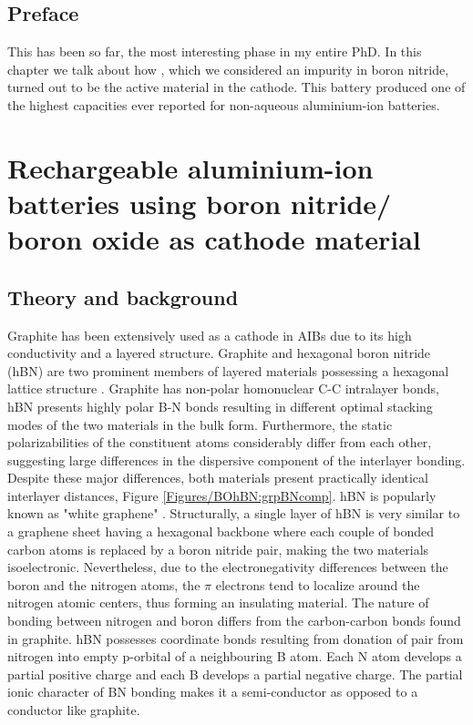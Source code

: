\section*{Preface}
This has been so far, the most interesting phase in my entire PhD. In this chapter we talk about how , which we considered an impurity in boron nitride, turned out to be the active material in the cathode. This battery produced one of the highest capacities ever reported for non-aqueous aluminium-ion batteries.   
\pagebreak
\chapter{Rechargeable aluminium-ion batteries using boron nitride/ boron oxide as cathode material} %
\label{BOhBN} %
\newcommand{\keyword}[1]{\textbf{#1}}
\newcommand{\tabhead}[1]{\textbf{#1}}
\newcommand{\code}[1]{\texttt{#1}}
\newcommand{\file}[1]{\texttt{\bfseries#1}}
\newcommand{\option}[1]{\texttt{\itshape#1}}
\section{Theory and background}
Graphite has been extensively used as a cathode in AIBs due to its high conductivity and a layered structure. Graphite and hexagonal boron nitride (hBN) are two prominent members of layered materials possessing a hexagonal lattice structure \cite{hod_graphite_2012}. Graphite has non-polar homonuclear C-C intralayer bonds, hBN presents highly polar B-N bonds resulting in different optimal stacking modes of the two materials in the bulk form. Furthermore, the static polarizabilities of the constituent atoms considerably differ from each other, suggesting large differences in the dispersive component of the interlayer bonding. Despite these major differences, both materials present practically identical interlayer distances, Figure \ref{Figures/BOhBN:grpBNcomp}. hBN is popularly known as "white graphene" \cite{song_large_2010, zeng_white_2010}. Structurally, a single layer of hBN is very similar to a graphene sheet having a hexagonal backbone where each couple of bonded carbon atoms is replaced by a boron nitride pair, making the two materials isoelectronic. Nevertheless, due to the electronegativity differences between the boron and the nitrogen atoms, the $\pi$ electrons tend to localize around the nitrogen atomic centers, thus forming an insulating material. The nature of bonding between nitrogen and boron differs from the carbon-carbon bonds found in graphite. hBN possesses coordinate bonds resulting from donation of  pair from nitrogen into empty p-orbital of a neighbouring B atom. Each N atom develops a partial positive charge and each B develops a partial negative charge. The partial ionic character of BN bonding makes it a semi-conductor as opposed to a conductor like graphite. 


